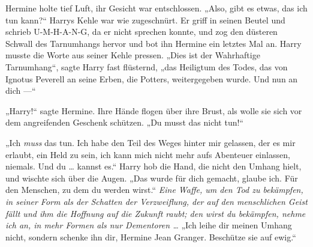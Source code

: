 Hermine holte tief Luft, ihr Gesicht war entschlossen.
„Also, gibt es etwas, das ich tun kann?“
Harrys Kehle war wie zugeschnürt. Er griff in seinen Beutel und schrieb U-M-H-A-N-G, da er nicht sprechen konnte, und zog den düsteren Schwall des Tarnumhangs hervor und bot ihn Hermine ein letztes Mal an. Harry musste die Worte aus seiner Kehle pressen.
„Dies ist der Wahrhaftige Tarnumhang“, sagte Harry fast flüsternd, „das Heiligtum des Todes, das von Ignotus Peverell an seine Erben, die Potters, weitergegeben wurde. Und nun an dich —“

„Harry!“ sagte Hermine. Ihre Hände flogen über ihre Brust, als wolle sie sich vor dem angreifenden Geschenk schützen.
„Du musst das nicht tun!“

„Ich \emph{muss} das tun. Ich habe den Teil des Weges hinter mir gelassen, der es mir erlaubt, ein Held zu sein, ich kann mich nicht mehr aufs Abenteuer einlassen, niemals. Und du … kannst es.“ Harry hob die Hand, die nicht den Umhang hielt, und wischte sich über die Augen.
„Das wurde für dich gemacht, glaube ich. Für den Menschen, zu dem du werden wirst.“
\emph{Eine Waffe, um den Tod zu bekämpfen, in seiner Form als der Schatten der Verzweiflung, der auf den menschlichen Geist fällt und ihm die Hoffnung auf die Zukunft raubt; den wirst du bekämpfen, nehme ich an, in mehr Formen als nur Dementoren …}
„Ich leihe dir meinen Umhang nicht, sondern schenke ihn dir, Hermine Jean Granger. Beschütze sie auf ewig.“

